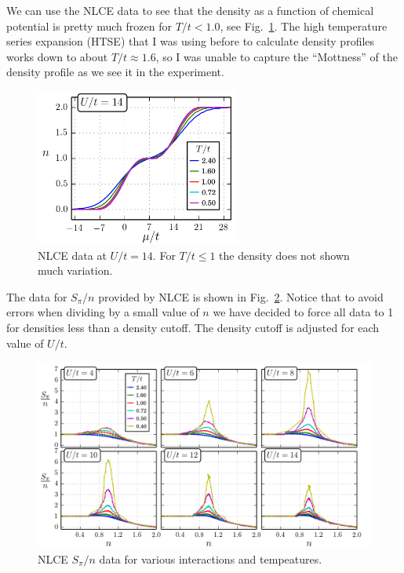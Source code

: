 \documentclass[11pt,letter]{article}
\begin{document}
We can use the NLCE data to see that the density as a function of chemical
potential is pretty much frozen for $T/t<1.0$, see Fig.~\ref{fig:NLCEdens}.
The high temperature series expansion (HTSE) that I was using before to
calculate density profiles works down to about $T/t\approx 1.6$, so I was
unable to capture the ``Mottness'' of the density profile as we see it in the
experiment.
\begin{figure}
    \centering
\includegraphics[width=0.6\textwidth]{../dataplots/NLCE_Final/U14_varyT.png}
\caption{NLCE data at $U/t=14$.  For $T/t \leq 1$ the density does not shown
much variation. }
\label{fig:NLCEdens}
\end{figure}


The data for $S_{\pi}/n$ provided by NLCE is shown in Fig.~\ref{fig:NLCESpin}.
Notice that to avoid errors when dividing by a small value of $n$ we have
decided to force all data to 1 for densities less than a density cutoff.  The
density cutoff is adjusted for each value of $U/t$.
\begin{figure}
    \centering
\includegraphics[width=\textwidth]{../dataplots/NLCE_Final/Spi_varyU_varyT.png}
\caption{NLCE $S_{\pi}/n$  data for various interactions and tempeatures.  }
\label{fig:NLCESpin}
\end{figure}
\end{document}
